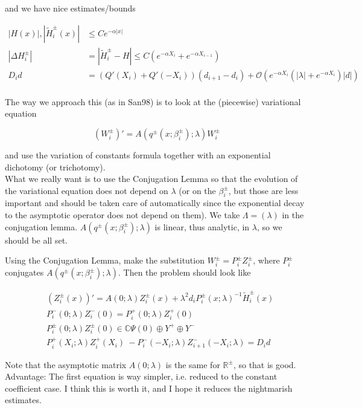 \documentclass[12pt]{article}
\def\R{{\mathbb R}}
\def\C{{\mathbb C}}
\begin{document}
and we have nice estimates/bounds

\begin{align*}
|H(x)|, |\tilde{H}_i^\pm(x)| &\leq C e^{-\alpha |x|} \\
|\Delta H_i^\pm| &= |\tilde{H}_i^\pm - H| \leq C(e^{-\alpha X_i} + e^{-\alpha X_{i-1}} ) \\
D_i d &= ( Q'(X_i) + Q'(-X_i))(d_{i+1} - d_i ) + \mathcal{O} \left( e^{-\alpha X_i} \left( |\lambda| +  e^{-\alpha X_i}  \right) |d| \right) \\
\end{align*}

The way we approach this (as in San98) is to look at the (piecewise) variational equation

\[
(W_i^\pm)' = A(q^\pm(x; \beta_i^\pm); \lambda) W_i^\pm
\]

and use the variation of constants formula together with an exponential dichotomy (or trichotomy).\\

What we really want is to use the Conjugation Lemma so that the evolution of the variational equation does not depend on $\lambda$ (or on the $\beta_i^\pm$, but those are less important and should be taken care of automatically since the exponential decay to the asymptotic operator does not depend on them). We take $\Lambda = (\lambda)$ in the conjugation lemma. $A(q^\pm(x; \beta_i^\pm); \lambda)$ is linear, thus analytic, in $\lambda$, so we should be all set.

Using the Conjugation Lemma, make the substitution $W_i^\pm = P_i^\pm Z_i^\pm$, where $P_i^\pm$ conjugates $A(q^\pm(x; \beta_i^\pm); \lambda)$. Then the problem should look like

\begin{align*}
&(Z_i^\pm(x))' = A(0; \lambda) Z_i^\pm(x) + \lambda^2 d_i P_i^\pm(x; \lambda)^{-1} \tilde{H}_i^\pm(x) \\
&P_i^-(0; \lambda) Z_i^-(0) = P_i^+(0; \lambda) Z_i^+(0) \\
&P_i^\pm(0; \lambda) Z_i^\pm(0) \in \C \Psi(0) \oplus Y^+ \oplus Y^-\\
&P_i^+(X_i; \lambda) Z_i^+(X_i)\ - P_i^-(-X_i; \lambda) Z_{i+1}^-(-X_i; \lambda) = D_i d
\end{align*}

Note that the asymptotic matrix $A(0; \lambda)$ is the same for $\R^\pm$, so that is good.\\

Advantage: The first equation is way simpler, i.e. reduced to the constant coefficient case. I think this is worth it, and I hope it reduces the nightmarish estimates.\\
\end{document}
